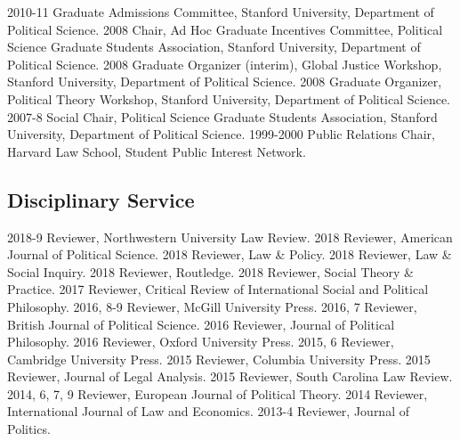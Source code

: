 \documentclass[letterpaper]{moderncv}
\begin{document}
\cvitem
{2010-11}
{Graduate Admissions Committee, Stanford University, Department of Political Science.}
\vspace{1mm}
\cvitem
{2008}
{Chair, Ad Hoc Graduate Incentives Committee, Political Science Graduate Students Association, Stanford University, Department of Political Science.}
\vspace{1mm}
\cvitem
{2008}
{Graduate Organizer (interim), Global Justice Workshop, Stanford University, Department of Political Science.}
\vspace{1mm}
\cvitem
{2008}
{Graduate Organizer, Political Theory Workshop, Stanford University, Department of Political Science.}
\vspace{1mm}
\cvitem
{2007-8}
{Social Chair, Political Science Graduate Students Association, Stanford University, Department of Political Science.}
\vspace{1mm}
\cvitem
{1999-2000}
{Public Relations Chair, Harvard Law School, Student Public Interest Network.}
\vspace{1mm}

\subsection{Disciplinary Service}
\cvitem
{2018-9}
{Reviewer, Northwestern University Law Review.}
\vspace{1mm}
\cvitem
{2018}
{Reviewer, American Journal of Political Science.}
\vspace{1mm}
\cvitem
{2018}
{Reviewer, Law \& Policy.}
\vspace{1mm}
\cvitem
{2018}
{Reviewer, Law \& Social Inquiry.}
\vspace{1mm}
\cvitem
{2018}
{Reviewer, Routledge.}
\vspace{1mm}
\cvitem
{2018}
{Reviewer, Social Theory \& Practice.}
\vspace{1mm}
\cvitem
{2017}
{Reviewer, Critical Review of International Social and Political Philosophy.}
\vspace{1mm}
\cvitem
{2016, 8-9}
{Reviewer, McGill University Press.}
\vspace{1mm}
\cvitem
{2016, 7}
{Reviewer, British Journal of Political Science.}
\vspace{1mm}
\cvitem
{2016}
{Reviewer, Journal of Political Philosophy.}
\vspace{1mm}
\cvitem
{2016}
{Reviewer, Oxford University Press.}
\vspace{1mm}
\cvitem
{2015, 6}
{Reviewer, Cambridge University Press.}
\vspace{1mm}
\cvitem
{2015}
{Reviewer, Columbia University Press.}
\vspace{1mm}
\cvitem
{2015}
{Reviewer, Journal of Legal Analysis.}
\vspace{1mm}
\cvitem
{2015}
{Reviewer, South Carolina Law Review.}
\vspace{1mm}
\cvitem
{2014, 6, 7, 9}
{Reviewer, European Journal of Political Theory.}
\vspace{1mm}
\cvitem
{2014}
{Reviewer, International Journal of Law and Economics.}
\vspace{1mm}
\cvitem
{2013-4}
{Reviewer, Journal of Politics.}
\vspace{1mm}
\end{document}

